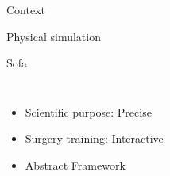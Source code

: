 \documentclass[xcolor={usenames,dvipsnames}]{beamer}
\begin{document}
\begin{frame}{Context}
    \begin{block}{Physical simulation}
        \hfill
        \parbox[c][.26\textheight][t]{.98\textwidth}{
        }
    \end{block}
    \pause
    \pause
    \pause
    \pause
    \begin{exampleblock}{Sofa \cite{Allard07SOFA,Nesme09Preserving,Faure11Sparse}}
        \begin{columns}
            \begin{itemize}
                \item<5-> Scientific purpose: \alert<5-6>{Precise}
                \item<6-> Surgery training: \alert<6>{Interactive} 
                \item<8-> \alert<8>{Abstract} Framework
                    \begin{itemize}

\end{itemize}
\end{itemize}
\end{columns}
\end{exampleblock}
\end{frame}
\end{document}
